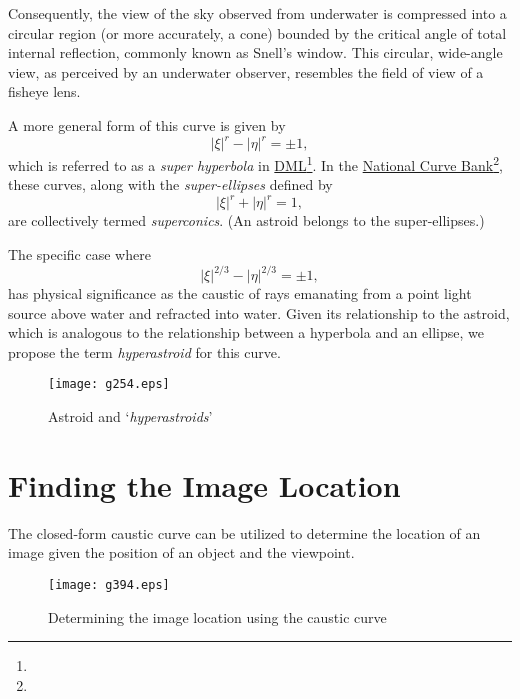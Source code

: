 \documentclass[twocolumn]{article}
\begin{document}
Consequently, the view of the sky observed from underwater is compressed into a circular region (or more accurately, a cone) bounded by the critical angle of total internal reflection, commonly known as Snell's window. This circular, wide-angle view, as perceived by an underwater observer, resembles the field of view of a fisheye lens.

A more general form of this curve is given by 
$$ \left| \xi \right|^{r} - \left| \eta \right|^{r} = \pm1, $$
which is referred to as a \emph{super hyperbola} in \href{http://dynamicmathematicslearning.com/super-ellipse.html}{DML}\footnote{}. In the \href{https://old.nationalcurvebank.org/superconicncb/superconicncb.htm}{National Curve Bank}\footnote{}, these curves, along with the \emph{super-ellipses} defined by
$$ \left| \xi \right|^{r} + \left| \eta \right|^{r} = 1, $$
are collectively termed \emph{superconics}. (An astroid belongs to the super-ellipses.) 

The specific case where 
$$ \left| \xi \right|^{2/3} - \left| \eta \right|^{2/3} = \pm1, $$
has physical significance as the caustic of rays emanating from a point light source above water and refracted into water. Given its relationship to the astroid, which is analogous to the relationship between a hyperbola and an ellipse, we propose the term \emph{hyperastroid} for this curve.

\begin{figure}[h]
	\centering
	\texttt{[image: g254.eps]}
	\caption{Astroid and `\emph{hyperastroids}'}
	\label{fig:hyperastroid}
\end{figure}

\section{Finding the Image Location}

The closed-form caustic curve can be utilized to determine the location of an image given the position of an object and the viewpoint.

\begin{figure}[h]
	\centering
	\texttt{[image: g394.eps]}
	\caption{Determining the image location using the caustic curve}
	\label{fig:image_caustic}
\end{figure}
\end{document}
